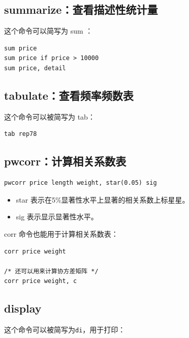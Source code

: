 \documentclass[]{ctexbook}
\providecommand{\tightlist}{%
  \setlength{\itemsep}{0pt}\setlength{\parskip}{0pt}}
\begin{document}
\hypertarget{summarize}{%
\subsection{summarize：查看描述性统计量}\label{summarize}}

这个命令可以简写为 sum ：

\begin{lstlisting}
sum price
sum price if price > 10000
sum price, detail
\end{lstlisting}

\hypertarget{tabulate}{%
\subsection{tabulate：查看频率频数表}\label{tabulate}}

这个命令可以被简写为 tab：

\begin{lstlisting}
tab rep78
\end{lstlisting}

\hypertarget{pwcorr}{%
\subsection{pwcorr：计算相关系数表}\label{pwcorr}}

\begin{lstlisting}
pwcorr price length weight, star(0.05) sig
\end{lstlisting}

\begin{itemize}
\tightlist
\item
  star 表示在5\%显著性水平上显著的相关系数上标星星。
\item
  sig 表示显示显著性水平。
\end{itemize}

corr 命令也能用于计算相关系数表：

\begin{lstlisting}
corr price weight

/* 还可以用来计算协方差矩阵 */
corr price weight, c
\end{lstlisting}

\hypertarget{display}{%
\subsection{display}\label{display}}

这个命令可以被简写为\texttt{di}，用于打印：
\end{document}
